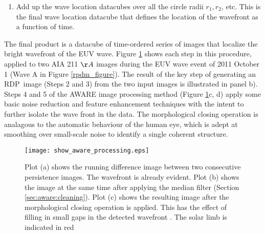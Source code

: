 \documentclass[namedreferences]{solarphysics}
\newcommand{\RDP}{RDP}
\begin{document}
\begin{article}
\begin{enumerate}
\begin{enumerate}
\item Apply a morphological closing operation.  This operation helps
  close small ‘cracks’ in structures \citep{2002dip..book.....G}.  The
  structuring element used is the same as that used by the median
  filtering operation. The final image is shown in Figure
  \ref{method_figure}d.  The final result is a datacube of images that
  show the location of the wavefront as a function of time, given the
  median filter and closing operations performed at length-scale $r$.
\end{enumerate}

\item Add up the wave location datacubes over all the circle radii
  $r_{1}, r_{2}$\textellipsis, etc.  This is the final wave location
  datacube that defines the location of the wavefront as a function of
  time.

\end{enumerate}

The final product is a datacube of time-ordered series of images that
localize the bright wavefront of the EUV wave.  Figure
\ref{method_figure} shows each step in this procedure, applied to two
AIA 211 $\AA$ images during the EUV wave event of 2011 October 1 (Wave
A in Figure \ref{rpdm_figure}).  The result of the key step of
generating an \RDP\ image (Steps 2 and 3) from the two input images is
illustrated in panel b). Steps 4 and 5 of the AWARE image processing
method (Figure \ref{method_figure}c, d) apply some basic noise
reduction and feature enhancement techniques with the intent to
further isolate the wave front in the data. The morphological closing
operation is analagous to the automatic behaviour of the human eye,
which is adept at smoothing over small-scale noise to identify a
single coherent structure.

\begin{figure}
\begin{center}
\texttt{[image: show\_aware\_processing.eps]}
\caption{Plot (a) shows the running difference image between two
  consecutive persistence images. The wavefront is already
  evident. Plot (b) shows the image at the same time after applying
  the median filter (Section \ref{sec:aware:cleaning}).  Plot (c)
  shows the resulting image after the morphological closing operation
  is applied.  This has the effect of filling in small gaps in the
  detected wavefront \citep[e.g.][]{2002dip..book.....G}. The solar
  limb is indicated in red}
\label{method_figure}
\end{center}
\end{figure}


\end{article}
\end{document}
